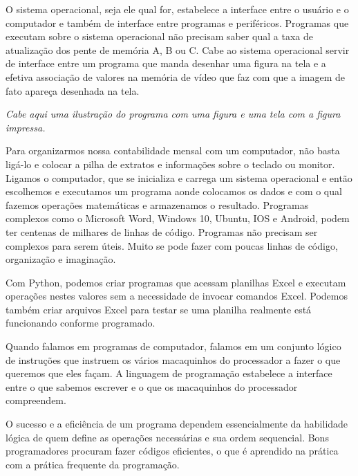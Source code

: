 \documentclass[
	12pt,				%
	openright,			%
	twoside,			%
	a4paper,			%
	english,			%
	french,				%
	brazil,				%
	sumario=tradicional
]{abntex2}
\begin{document}
O sistema operacional, seja ele qual for, estabelece a interface entre o usuário e o computador e também de 
interface entre programas e periféricos.
Programas que executam sobre o sistema operacional não precisam 
saber qual a taxa de atualização dos pente de memória A, B ou C. Cabe ao sistema operacional servir de interface
entre um programa que manda desenhar uma figura na tela e a efetiva associação de valores na memória de vídeo
que faz com que a imagem de fato apareça desenhada na tela.

\emph{Cabe aqui uma ilustração do programa com uma figura e uma tela com a figura impressa.} 

Para organizarmos nossa contabilidade mensal com um computador, não basta ligá-lo e colocar a pilha
de extratos e informações sobre o teclado ou monitor. Ligamos o computador, que se inicializa e carrega
um sistema operacional e então escolhemos e executamos um programa aonde colocamos os dados e com 
o qual fazemos operações matemáticas e armazenamos o resultado. Programas complexos como o Microsoft Word, 
Windows 10, Ubuntu, IOS e Android, podem ter centenas de milhares de linhas de código. Programas não precisam 
ser complexos para serem úteis. Muito se pode fazer com poucas linhas de código, organização e imaginação.  

Com Python, podemos criar programas que acessam planilhas Excel e executam operações nestes valores sem a necessidade
de invocar comandos Excel. Podemos também criar arquivos Excel para testar se uma planilha realmente está funcionando 
conforme programado. 

Quando falamos em programas de computador, falamos em um conjunto lógico de instruções que instruem 
os vários macaquinhos do processador a fazer o que queremos que eles façam. A linguagem de programação estabelece
a interface entre o que sabemos escrever e o que os macaquinhos do processador compreendem.

O sucesso e a eficiência de um programa dependem essencialmente da habilidade lógica de quem define as operações
necessárias e sua ordem sequencial. Bons programadores procuram fazer códigos eficientes, o que é aprendido na prática
com a prática frequente da programação. \cite{Norton}

\end{document}

